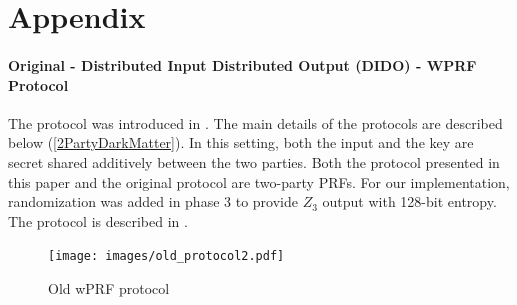 \section{Appendix}

\paragraph{Original - Distributed Input Distributed Output (DIDO) - WPRF Protocol}

The protocol was introduced in \cite{darkmatter}. The main details of the protocols are described below (\ref{2PartyDarkMatter}). In this setting, both the input and the key are secret shared additively between the two parties. Both the protocol presented in this paper and the original protocol are two-party PRFs. For our implementation, randomization was added in phase 3 to provide $Z_3$ output with 128-bit entropy. 
The protocol is described in .

\begin{figure}[ht]
	\centering
	\texttt{[image: images/old\_protocol2.pdf]}
	\vspace{-2mm}
	\caption{Old wPRF protocol}
	\label{old_protocol.fig}
	\vspace{-5mm}
\end{figure}


